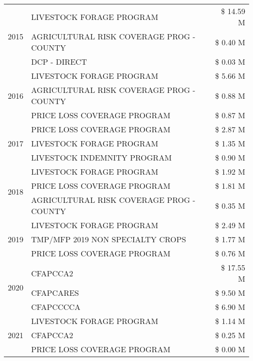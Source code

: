 \begin{tabular}{llr}
\multirow[t]{3}{*}{2015} & LIVESTOCK FORAGE PROGRAM & \$ 14.59 M \\
 & AGRICULTURAL RISK COVERAGE PROG - COUNTY & \$ 0.40 M \\
 & DCP - DIRECT & \$ 0.03 M \\
\cline{1-3}
\multirow[t]{3}{*}{2016} & LIVESTOCK FORAGE PROGRAM & \$ 5.66 M \\
 & AGRICULTURAL RISK COVERAGE PROG - COUNTY & \$ 0.88 M \\
 & PRICE LOSS COVERAGE PROGRAM & \$ 0.87 M \\
\cline{1-3}
\multirow[t]{3}{*}{2017} & PRICE LOSS COVERAGE PROGRAM & \$ 2.87 M \\
 & LIVESTOCK FORAGE PROGRAM & \$ 1.35 M \\
 & LIVESTOCK INDEMNITY PROGRAM & \$ 0.90 M \\
\cline{1-3}
\multirow[t]{3}{*}{2018} & LIVESTOCK FORAGE PROGRAM & \$ 1.92 M \\
 & PRICE LOSS COVERAGE PROGRAM & \$ 1.81 M \\
 & AGRICULTURAL RISK COVERAGE PROG - COUNTY & \$ 0.35 M \\
\cline{1-3}
\multirow[t]{3}{*}{2019} & LIVESTOCK FORAGE PROGRAM & \$ 2.49 M \\
 & TMP/MFP 2019 NON SPECIALTY CROPS & \$ 1.77 M \\
 & PRICE LOSS COVERAGE PROGRAM & \$ 0.76 M \\
\cline{1-3}
\multirow[t]{3}{*}{2020} & CFAPCCA2 & \$ 17.55 M \\
 & CFAPCARES & \$ 9.50 M \\
 & CFAPCCCCA & \$ 6.90 M \\
\cline{1-3}
\multirow[t]{3}{*}{2021} & LIVESTOCK FORAGE PROGRAM & \$ 1.14 M \\
 & CFAPCCA2 & \$ 0.25 M \\
 & PRICE LOSS COVERAGE PROGRAM & \$ 0.00 M \\
\cline{1-3}
\bottomrule
\end{tabular}

